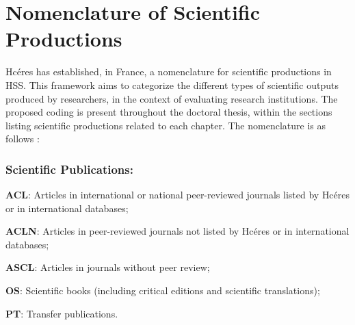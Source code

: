 \section*{Nomenclature of Scientific Productions
    \label{subbody:nomenclature-productions-scientifiques}
    }

\acrfull{Hcéres} has established, in France, a nomenclature for scientific productions in \acrfull{HSS}. This framework aims to categorize the different types of scientific outputs produced by researchers, in the context of evaluating research institutions. The proposed coding is present throughout the doctoral thesis, within the sections listing scientific productions related to each chapter. The nomenclature is as follows \textcolor{blue}{\autocite{ministere_de_leducation_nationale_de_lenseignement_superieur_et_de_la_recherche_nomenclatures_nodate}}:%

\subsubsection*{Scientific Publications:}
    \begin{customitemize}
\item \textbf{ACL}: Articles in international or national peer-reviewed journals listed by \acrshort{Hcéres} or in international databases;
\item \textbf{ACLN}: Articles in peer-reviewed journals not listed by \acrshort{Hcéres} or in international databases;
\item \textbf{ASCL}: Articles in journals without peer review;
\item \textbf{OS}: Scientific books (including critical editions and scientific translations);
\item \textbf{PT}: Transfer publications.
    \end{customitemize}

